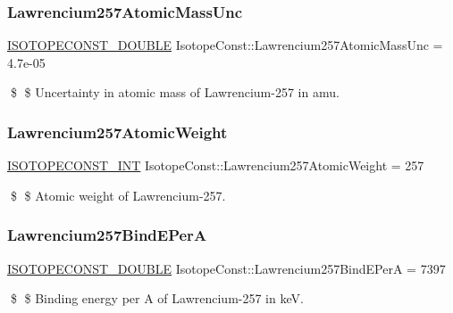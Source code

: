 \subsubsection{\texorpdfstring{Lawrencium257\+Atomic\+Mass\+Unc}{Lawrencium257AtomicMassUnc}}
{\footnotesize\ttfamily \mbox{\hyperlink{group___isotope_const-_macros_ga8f45a7272ce02c0b4c65c44636ed719a}{I\+S\+O\+T\+O\+P\+E\+C\+O\+N\+S\+T\+\_\+\+D\+O\+U\+B\+LE}} Isotope\+Const\+::\+Lawrencium257\+Atomic\+Mass\+Unc = 4.\+7e-\/05}

\$ \$ Uncertainty in atomic mass of Lawrencium-\/257 in amu. \mbox{\label{group___isotope_const-_lawrencium-_lr257_ga66ba67436a05fef49b9fedff8d0095d6}} 
\subsubsection{\texorpdfstring{Lawrencium257\+Atomic\+Weight}{Lawrencium257AtomicWeight}}
{\footnotesize\ttfamily \mbox{\hyperlink{group___isotope_const-_macros_ga5f18360b3e99483a35c32d789e62621c}{I\+S\+O\+T\+O\+P\+E\+C\+O\+N\+S\+T\+\_\+\+I\+NT}} Isotope\+Const\+::\+Lawrencium257\+Atomic\+Weight = 257}

\$ \$ Atomic weight of Lawrencium-\/257. \mbox{\label{group___isotope_const-_lawrencium-_lr257_ga025add3cdee102bc6005dc58ada7495b}} 
\subsubsection{\texorpdfstring{Lawrencium257\+Bind\+E\+PerA}{Lawrencium257BindEPerA}}
{\footnotesize\ttfamily \mbox{\hyperlink{group___isotope_const-_macros_ga8f45a7272ce02c0b4c65c44636ed719a}{I\+S\+O\+T\+O\+P\+E\+C\+O\+N\+S\+T\+\_\+\+D\+O\+U\+B\+LE}} Isotope\+Const\+::\+Lawrencium257\+Bind\+E\+PerA = 7397}

\$ \$ Binding energy per A of Lawrencium-\/257 in keV. \mbox{\label{group___isotope_const-_lawrencium-_lr257_gaddea1b717efc3a337aad03499b5f2627}} 
